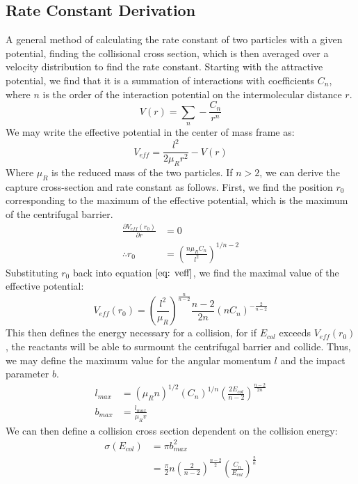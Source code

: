 \subsection{Rate Constant Derivation} \label{sec: ACT}
A general method of calculating the rate constant of two particles with a given potential, finding the collisional cross section, which is then averaged over a velocity distribution to find the rate constant.\cite{Zhang2017} Starting with the attractive potential, we find that it is a summation of interactions with coefficients $C_n$, where $n$ is the order of the interaction potential on the intermolecular distance $r$.
\begin{equation}
    V(r) = \sum_n -\frac{C_n}{r^n}
\end{equation}
We may write the effective potential in the center of mass frame as:
\begin{equation}
    V_{eff} = \frac{l^2}{2 \mu_R r^2} -V(r)\label{eq: veff}
\end{equation}
Where $\mu_R$ is the reduced mass of the two particles. If $n > 2$, we can derive the capture cross-section and rate constant as follows. First, we find the position $r_0$ corresponding to the maximum of the effective potential, which is the maximum of the centrifugal barrier.
\begin{align*}
    \frac{\partial V_{eff}(r_0)}{\partial r} & = 0 \\
    \therefore r_0 & = \left(\frac{n \mu_R C_n}{l^2}\right)^{1/n-2}
\end{align*}
Substituting $r_0$ back into equation $\ref{eq: veff}$, we find the maximal value of the effective potential:
\begin{equation}
    V_{eff}(r_0) = \left(\frac{l^2}{\mu_R}\right)^{\frac{n}{n-2}} \frac{n-2}{2n}(n C_n)^{-\frac{2}{n-2}}
\end{equation}
This then defines the energy necessary for a collision, for if $E_{col}$ exceeds $V_{eff}(r_0)$, the reactants will be able to surmount the centrifugal barrier and collide. Thus, we may define the maximum value for the angular momentum $l$ and the impact parameter $b$.
\begin{align*}
    l_{max} & = (\mu_R n)^{1/2}(C_n)^{1/n} \left(\frac{2 E_{col}}{n-2}\right)^{\frac{n-2}{2n}} \\
    b_{max} & = \frac{l_{max}}{\mu_R v}
\end{align*}
We can then define a collision cross section dependent on the collision energy:
\begin{align*}
    \sigma(E_{col}) & = \pi b^2_{max} \\
    & = \frac{\pi}{2} n \left(\frac{2}{n-2}\right)^{\frac{n-2}{2}} \left(\frac{C_n}{E_{col}}\right)^{\frac{2}{n}}
\end{align*}
